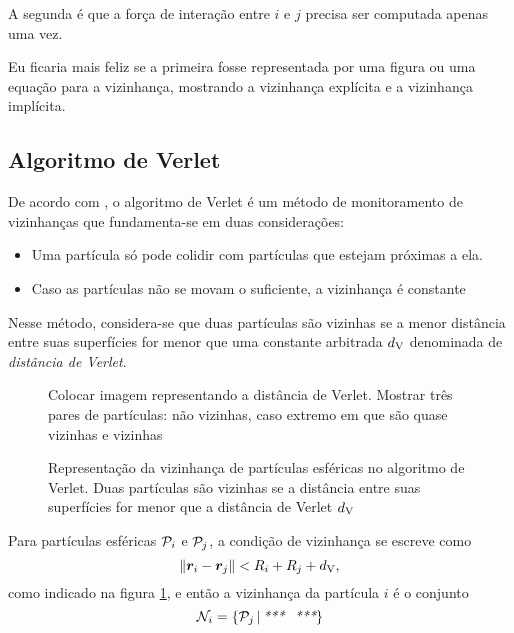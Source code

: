 A segunda é que a força de interação entre \(i\) e \(j\) precisa ser computada apenas uma vez.

\alert{Eu ficaria mais feliz se a primeira fosse representada por uma figura ou uma equação para a vizinhança, mostrando a vizinhança explícita e a vizinhança implícita.}

\subsection{Algoritmo de Verlet}

De acordo com , o algoritmo de Verlet é um método de monitoramento de vizinhanças que fundamenta-se em duas considerações:
\begin{itemize}
	\item Uma partícula só pode colidir com partículas que estejam próximas a ela.
	\item \alert{Caso as partículas não se movam o suficiente, a vizinhança é constante}
\end{itemize}

Nesse método, considera-se que duas partículas são vizinhas se a menor distância entre suas superfícies for menor que uma constante arbitrada \(d_{\text{V}}\) denominada de \textit{distância de Verlet}.

\begin{figure}[h]
	\caption{Representação da vizinhança de partículas esféricas no algoritmo de Verlet. Duas partículas são vizinhas se a distância entre suas superfícies for menor que a distância de Verlet \(d_{\text{V}}\)}
	\begin{center}
		\alert{Colocar imagem representando a distância de Verlet. Mostrar três pares de partículas: não vizinhas, caso extremo em que são quase vizinhas e vizinhas}
	\end{center}
	\label{fig:verlet_distance}
\end{figure}

Para partículas esféricas \(\particlei\) e \(\particlej\), a condição de vizinhança se escreve como
\begin{equation*}
	\norm{{\bm{r}}_{i} - {\bm{r}}_{j}} < {R}_{i} + {R}_{j} + d_{\text{V}},
\end{equation*}
como indicado na figura \ref{fig:verlet_distance}, e então a vizinhança da partícula \(i\) é o conjunto
\begin{equation*}
	\neighborhoodi = \set{\particlej \suchThat \alert{}}
\end{equation*}

